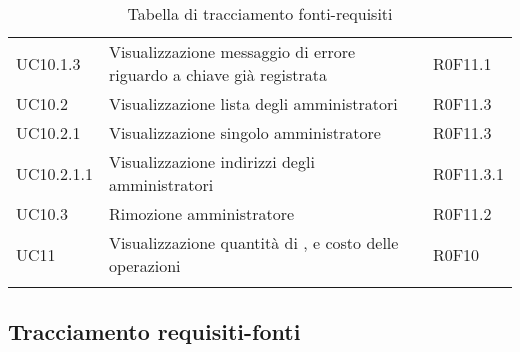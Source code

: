 \documentclass[AnalisiDeiRequisiti.tex]{subfiles}
\begin{document}
\begin{longtable}[H]{p{2cm}p{5cm}p{5cm}}
	UC10.1.3 & Visualizzazione messaggio di errore riguardo a chiave già registrata & R0F11.1 \\
	UC10.2 & Visualizzazione lista degli amministratori & R0F11.3 \\
	UC10.2.1 & Visualizzazione singolo amministratore & R0F11.3 \\
	UC10.2.1.1 & Visualizzazione indirizzi degli amministratori & R0F11.3.1 \\
	UC10.3 & Rimozione amministratore & R0F11.2 \\	
	UC11 & Visualizzazione quantità di \citGloss{Gas}, \citGloss{Ether} e costo delle operazioni & R0F10 \\
	\hiderowcolors
	\caption{Tabella di tracciamento fonti-requisiti}
\end{longtable}

\newpage
\subsection{Tracciamento requisiti-fonti}
\end{document}
